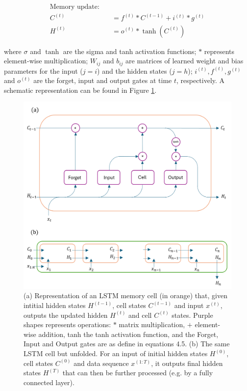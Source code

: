 \documentclass[11pt,a4paper,twoside,openright]{report}
\theoremstyle{definition}
\begin{document}
\begin{equation}
  \begin{aligned}
  \text{Memory update:} \quad & \\
    C^{(t)} &= f^{(t)} \ast C^{(t-1)} + i^{(t)} \ast g^{(t)} \\
    H^{(t)} &= o^{(t)} \ast \tanh \left( C^{(t)}\right)
  \end{aligned}
\label{eq:lstm2}
\end{equation}

where \(\sigma\) and \(\tanh\) are the sigma and tanh activation functions; \(\ast\) represents element-wise multiplication; \(W_{ij}\) and \(b_{ij}\) are matrices of learned weight and bias parameters for the input (\(j=i\)) and the hidden states (\(j=h\)); \(i^{(t)},f^{(t)},g^{(t)}\) and \(o^{(t)}\) are the forget, input and output gates at time \(t\), respectively. A schematic representation can be found in Figure \ref{fig:lstm}.

\begin{figure}[h]

{\centering \includegraphics[width=0.8\linewidth]{images/lstm_fig} 

}

\caption{(a) Representation of an LSTM memory cell (in orange) that, given intitial hidden states $H^{(t-1)}$, cell states $C^{(t-1)}$ and input $x^{(t)}$, outputs the updated hidden $H^{(t)}$ and cell $C^{(t)}$ states. Purple shapes represents operations: $\ast$ matrix multiplication, $+$ element-wise addition, tanh the tanh activation function, and the Forget, Input and Output gates are as define in equations 4.5. (b) The same LSTM cell but unfolded. For an input of initial hidden states $H^{(0)}$, cell states $C^{(0)}$ and data sequence $x^{(1:T)}$, it outputs final hidden states $H^{(T)}$ that can then be further processed (e.g. by a fully connected layer).}\label{fig:lstm}
\end{figure}
\end{document}

